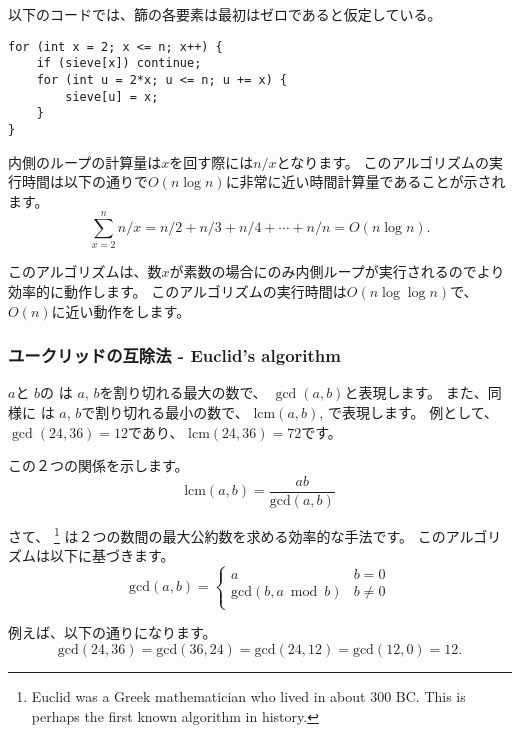 以下のコードでは、篩の各要素は最初はゼロであると仮定している。

\begin{lstlisting}
for (int x = 2; x <= n; x++) {
    if (sieve[x]) continue;
    for (int u = 2*x; u <= n; u += x) {
        sieve[u] = x;
    }
}
\end{lstlisting}

内側のループの計算量は$x$を回す際には$n/x$となります。
このアルゴリズムの実行時間は以下の通りで$ O(n \log n)$に非常に近い時間計算量であることが示されます。
\[\sum_{x=2}^n n/x = n/2 + n/3 + n/4 + \cdots + n/n = O(n \log n).\]


このアルゴリズムは、数$x$が素数の場合にのみ内側ループが実行されるのでより効率的に動作します。
このアルゴリズムの実行時間は$O(n \log \log n)$で、$O(n)$に近い動作をします。

\subsubsection{ユークリッドの互除法 - Euclid's algorithm}



$a$と $b$の
は
$a$, $b$を割り切れる最大の数で、
 $\gcd(a,b)$と表現します。
 また、同様に
 は
$a$, $b$で割り切れる最小の数で、
 $\textrm{lcm}(a,b)$,
で表現します。
例として、
$\gcd(24,36)=12$であり、
$\textrm{lcm}(24,36)=72$です。

この２つの関係を示します。
\[\textrm{lcm}(a,b)=\frac{ab}{\textrm{gcd}(a,b)}\]

さて、
\footnote{Euclid was a Greek mathematician who
lived in about 300 BC. This is perhaps the first known algorithm in history.}
は２つの数間の最大公約数を求める効率的な手法です。
このアルゴリズムは以下に基づきます。
\begin{equation*}
    \textrm{gcd}(a,b) = \begin{cases}
               a        & b = 0\\
               \textrm{gcd}(b,a \bmod b) & b \neq 0\\
           \end{cases}
\end{equation*}

例えば、以下の通りになります。
\[\textrm{gcd}(24,36) = \textrm{gcd}(36,24)
= \textrm{gcd}(24,12) = \textrm{gcd}(12,0)=12.\]

